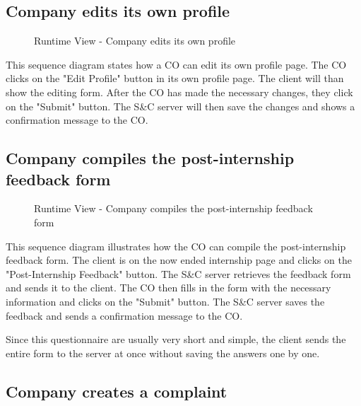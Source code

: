 \subsection{Company edits its own profile}
\label{sub:company-edits-its-own-profile}%

\begin{figure}[H]
      \centering
      \caption{Runtime View - Company edits its own profile}
      \label{fig:rv-co-edits-profile}
\end{figure}

\par This sequence diagram states how a CO can edit its own profile page. The CO clicks on the "Edit Profile" button 
in its own profile page. The client will than show the editing form. After the CO has made the necessary changes, 
they click on the "Submit" button. The S\&C server will then save the changes and shows a confirmation message to the 
CO.

\subsection{Company compiles the post-internship feedback form}
\label{sub:company-compiles-the-post-internship-feedback-form}%

\begin{figure}[H]
      \centering
      \caption{Runtime View - Company compiles the post-internship feedback form}
      \label{fig:rv-co-compiles-feedback-form}
\end{figure}

\par This sequence diagram illustrates how the CO can compile the post-internship feedback form. The client is on the 
now ended internship page and clicks on the "Post-Internship Feedback" button. The S\&C server retrieves the feedback 
form and sends it to the client. The CO then fills in the form with the necessary information and clicks on the 
"Submit" button. The S\&C server saves the feedback and sends a confirmation message to the CO.

\par Since this questionnaire are usually very short and simple, the client sends the entire form to the server at 
once without saving the answers one by one.

\subsection{Company creates a complaint}
\label{sub:company-creates-a-complaint}%

